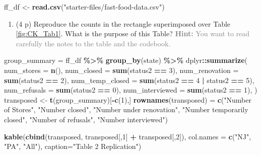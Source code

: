 \documentclass[
]{article}
\newenvironment{Shaded}{\begin{snugshade}}{\end{snugshade}}
\newcommand{\AttributeTok}[1]{\textcolor[rgb]{0.13,0.29,0.53}{#1}}
\newcommand{\DecValTok}[1]{\textcolor[rgb]{0.00,0.00,0.81}{#1}}
\newcommand{\FunctionTok}[1]{\textcolor[rgb]{0.13,0.29,0.53}{\textbf{#1}}}
\newcommand{\NormalTok}[1]{#1}
\newcommand{\OtherTok}[1]{\textcolor[rgb]{0.56,0.35,0.01}{#1}}
\newcommand{\SpecialCharTok}[1]{\textcolor[rgb]{0.81,0.36,0.00}{\textbf{#1}}}
\newcommand{\StringTok}[1]{\textcolor[rgb]{0.31,0.60,0.02}{#1}}
\providecommand{\tightlist}{%
  \setlength{\itemsep}{0pt}\setlength{\parskip}{0pt}}
\begin{document}
\begin{Shaded}
\begin{Highlighting}[]
\NormalTok{ff\_df }\OtherTok{\textless{}{-}} \FunctionTok{read.csv}\NormalTok{(}\StringTok{"starter{-}files/fast{-}food{-}data.csv"}\NormalTok{)}
\end{Highlighting}
\end{Shaded}

\begin{enumerate}
\def\labelenumi{\arabic{enumi}.}
\setcounter{enumi}{10}
\tightlist
\item
  (4 p) Reproduce the counts in the rectangle superimposed over Table
  \ref{fig:CK_Tab1}. What is the purpose of this Table?
  \textcolor{gray}{\textbf{Hint:} You want to read carefully the notes to the table and the codebook.}
\end{enumerate}

\begin{Shaded}
\begin{Highlighting}[]
\NormalTok{group\_summary }\OtherTok{=}\NormalTok{ ff\_df }\SpecialCharTok{\%\textgreater{}\%} \FunctionTok{group\_by}\NormalTok{(state) }\SpecialCharTok{\%\textgreater{}\%}
\NormalTok{  dplyr}\SpecialCharTok{::}\FunctionTok{summarize}\NormalTok{(}
    \AttributeTok{num\_stores =} \FunctionTok{n}\NormalTok{(),}
    \AttributeTok{num\_closed =} \FunctionTok{sum}\NormalTok{(status2 }\SpecialCharTok{==} \DecValTok{3}\NormalTok{),}
    \AttributeTok{num\_renovation =} \FunctionTok{sum}\NormalTok{(status2 }\SpecialCharTok{==} \DecValTok{2}\NormalTok{),}
    \AttributeTok{num\_temp\_closed =} \FunctionTok{sum}\NormalTok{(status2 }\SpecialCharTok{==} \DecValTok{4} \SpecialCharTok{|}\NormalTok{ status2 }\SpecialCharTok{==} \DecValTok{5}\NormalTok{),}
    \AttributeTok{num\_refusals =} \FunctionTok{sum}\NormalTok{(status2 }\SpecialCharTok{==} \DecValTok{0}\NormalTok{),}
    \AttributeTok{num\_interviewed =} \FunctionTok{sum}\NormalTok{(status2 }\SpecialCharTok{==} \DecValTok{1}\NormalTok{),}
\NormalTok{  )}
\NormalTok{transposed }\OtherTok{\textless{}{-}} \FunctionTok{t}\NormalTok{(group\_summary)[}\SpecialCharTok{{-}}\FunctionTok{c}\NormalTok{(}\DecValTok{1}\NormalTok{),]}
\FunctionTok{rownames}\NormalTok{(transposed) }\OtherTok{=} \FunctionTok{c}\NormalTok{(}\StringTok{"Number of Stores"}\NormalTok{,}
                         \StringTok{"Number closed"}\NormalTok{,}
                         \StringTok{"Number under renovation"}\NormalTok{,}
                         \StringTok{"Number temporarily closed"}\NormalTok{,}
                         \StringTok{"Number of refusals"}\NormalTok{,}
                         \StringTok{"Number interviewed"}\NormalTok{)}

\FunctionTok{kable}\NormalTok{(}\FunctionTok{cbind}\NormalTok{(transposed, transposed[,}\DecValTok{1}\NormalTok{] }\SpecialCharTok{+}\NormalTok{ transposed[,}\DecValTok{2}\NormalTok{]),}
    \AttributeTok{col.names =} \FunctionTok{c}\NormalTok{(}\StringTok{"NJ"}\NormalTok{, }\StringTok{"PA"}\NormalTok{, }\StringTok{"All"}\NormalTok{),}
    \AttributeTok{caption=}\StringTok{"Table 2 Replication"}\NormalTok{)}
\end{Highlighting}
\end{Shaded}
\end{document}
